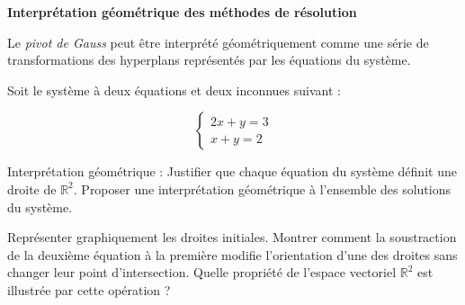 \documentclass[10pt,a4paper]{article}
\begin{document}
\bigskip
\textbf{Interprétation géométrique des méthodes de résolution}

Le \textit{pivot de Gauss} peut être interprété géométriquement comme une série de transformations
des hyperplans représentés par les équations du système.

Soit le système à deux équations et deux inconnues suivant :

$$
\begin{cases}
2x + y = 3 \\
x + y = 2
\end{cases}
$$

\q Interprétation géométrique : Justifier que chaque équation du système définit une droite de
$\mathbb{R}^2$. Proposer une interprétation géométrique à l'ensemble des solutions du système.

\q Représenter graphiquement les droites initiales. Montrer comment la soustraction de la deuxième
équation à la première modifie l'orientation d'une des droites sans changer leur point
d'intersection. Quelle propriété de l'espace vectoriel $\mathbb{R}^2$ est illustrée par cette
opération ?
\end{document}
